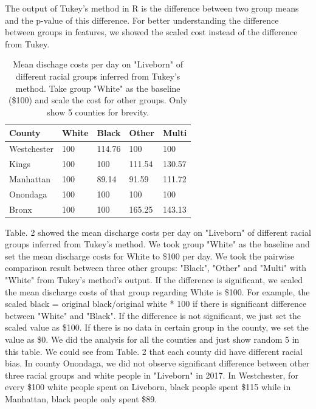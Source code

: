 \documentclass[10pt,twocolumn,letterpaper]{article}
\begin{document}
The output of Tukey's method in R is the difference between two group means and the p-value of this difference. For better understanding the difference between groups in features, we showed the scaled cost instead of the difference from Tukey. 
\begin{table}[]
\small
\begin{center}
\begin{tabular}{|l|l|l|l|l|}
\hline
\textbf{County} & \textbf{White} & \textbf{Black} & \textbf{Other} & \textbf{Multi} \\ \hline
Westchester     & 100            & 114.76         & 100            & 100            \\ \hline
Kings           & 100            & 100            & 111.54         & 130.57         \\ \hline
Manhattan       & 100            & 89.14          & 91.59          & 111.72         \\ \hline
Onondaga        & 100            & 100            & 100            & 100            \\ \hline
Bronx           & 100            & 100            & 165.25         & 143.13         \\ \hline
\end{tabular}
\end{center}
\caption{Mean dischage costs per day on "Liveborn" of different racial groups inferred from Tukey's method. Take group "White" as the baseline (\$100) and scale the cost for other groups. Only show 5 counties for brevity.}
\label{Tukey-race-birth}
\end{table}
Table. 2 showed the mean discharge costs per day on "Liveborn" of different racial groups inferred from Tukey's method. We took group "White" as the baseline and set the mean discharge costs for White to \$100 per day. We took the pairwise comparison result between three other groups: "Black", "Other" and "Multi" with "White" from Tukey's method's output. If the difference is significant, we scaled the mean discharge costs of that group regarding White is \$100. For example, the scaled black = original black/original white * 100 if there is significant difference between "White" and "Black". If the difference is not significant, we just set the scaled value as \$100. If there is no data in certain group in the county, we set the value as \$0. We did the analysis for all the counties and just show random 5 in this table.
We could see from Table. 2 that each county did have different racial bias. In county Onondaga, we did not observe significant difference between other three racial groups and white people in "Liveborn" in 2017. In Westchester, for every \$100 white people spent on Liveborn, black people spent \$115 while in Manhattan, black people only spent \$89.
\end{document}
